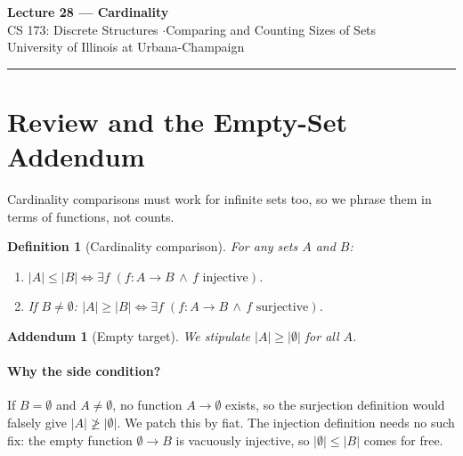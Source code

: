 \documentclass[11pt]{article}
\theoremstyle{defstyle}
\newtheorem{definition}{Definition}[section]
\theoremstyle{thmstyle}
\theoremstyle{notstyle}
\newtheorem*{addendum}{Addendum}
\theoremstyle{cautionstyle}
\newcommand{\card}[1]{\lvert #1 \rvert}
\begin{document}
\begin{center}
  {\Large\bfseries Lecture 28 --- Cardinality}\\[4pt]
  {\normalsize CS 173: Discrete Structures \quad$\cdot$\quad Comparing and Counting Sizes of Sets}\\[2pt]
  {\small\color{gray} University of Illinois at Urbana-Champaign}
\end{center}
\vspace{1em}\hrule\vspace{1.5em}

\section{Review and the Empty-Set Addendum}

Cardinality comparisons must work for infinite sets too, so we phrase them in
terms of functions, not counts.

\begin{defbox}
\begin{definition}[Cardinality comparison]
For any sets $A$ and $B$:
\begin{enumerate}[label=\textnormal{(\roman*)}, leftmargin=2em, itemsep=2pt]
  \item $\card{A} \leq \card{B} \iff \exists f \;(f : A \to B \,\land\, f \text{ injective})$.
  \item If $B \neq \emptyset$:
        $\card{A} \geq \card{B} \iff \exists f \;(f : A \to B \,\land\, f \text{ surjective})$.
\end{enumerate}
\end{definition}
\end{defbox}

\begin{notebox}
\begin{addendum}[Empty target]
We stipulate $\card{A} \geq \card{\emptyset}$ for all $A$.
\end{addendum}
\end{notebox}

\paragraph{Why the side condition?}
If $B = \emptyset$ and $A \neq \emptyset$, no function $A \to \emptyset$
exists, so the surjection definition would falsely give
$\card{A} \not\geq \card{\emptyset}$. We patch this by fiat. The injection
definition needs no such fix: the empty function $\emptyset \to B$ is
vacuously injective, so $\card{\emptyset} \leq \card{B}$ comes for free.
\end{document}
